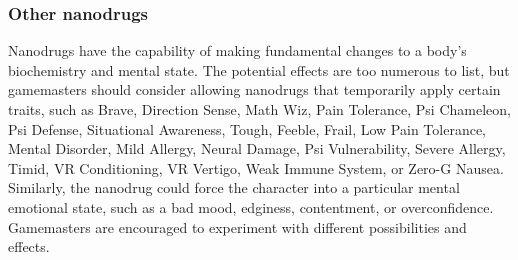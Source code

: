 \subsubsection{Other nanodrugs} 

Nanodrugs have the capability of making fundamental changes to a body’s biochemistry and mental state. The potential effects are too numerous to list, but gamemasters should consider allowing nanodrugs that temporarily apply certain traits, such as Brave, Direction Sense, Math Wiz, Pain Tolerance, Psi Chameleon, Psi Defense, Situational Awareness, Tough, Feeble, Frail, Low Pain Tolerance, Mental Disorder, Mild Allergy, Neural Damage, Psi Vulnerability, Severe Allergy, Timid, VR Conditioning, VR Vertigo, Weak Immune System, or Zero-G Nausea. Similarly, the nanodrug could force the character into a particular mental emotional state, such as a bad mood, edginess, contentment, or overconfidence. Gamemasters are encouraged to experiment with different possibilities and effects. 

\hspace{1cm} 

